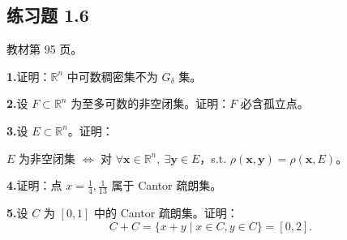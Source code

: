 \documentclass[11pt,a4paper]{article}
\begin{document}
\subsection*{练习题 1.6}
\noindent 教材第 95 页。
\par{}\noindent\textbf{1.}\quad 证明：$\mathbb R^n$ 中可数稠密集不为 $G_\delta$ 集。
\par{}\noindent\textbf{2.}\quad 设 $F\subset\mathbb R^n$ 为至多可数的非空闭集。证明：$F$ 必含孤立点。
\par{}\noindent\textbf{3.}\quad 设 $E\subset\mathbb R^n$。证明：
\par\noindent $E$ 为非空闭集 $\Leftrightarrow$ 对 $\forall\boldsymbol{x}\in\mathbb R^n,\ \exists\boldsymbol{y}\in E$，s.t. $\rho(\boldsymbol{x},\boldsymbol{y})=\rho(\boldsymbol{x},E)$。
\par{}\noindent\textbf{4.}\quad 证明：点 $x=\frac14,\frac1{13}$ 属于 Cantor 疏朗集。
\par{}\noindent\textbf{5.}\quad 设 $C$ 为 $[0,1]$ 中的 Cantor 疏朗集。证明：
\[C+C=\{x+y\mid x\in C,y\in C\}=[0,2].\]
\end{document}
